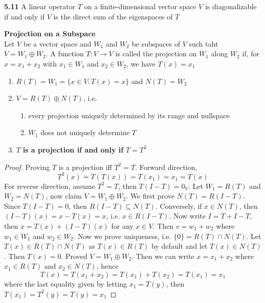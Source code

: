 \documentclass[11pt]{article}
\begin{document}
\begin{theorem*}
    \textbf{5.11} A linear operator $T$ on a finite-dimensional vector space $V$ is diagonalizable if and only if $V$ is the direct sum of the eigenspaces of $T$
\end{theorem*}



\begin{defn*}
    \textbf{Projection on a Subspace} \\
    Let $V$ be a vector space and $W_1$ and $W_2$ be subspaces of $V$ such taht $V = W_1 \oplus W_2$. A function $T:V\to V$ is called the projection on $W_1$ along $W_2$ if, for $x = x_1 + x_2$ with $x_1 \in W_1$ and $x_2\in W_2$, we have $T(x) = x_1$
    \begin{enumerate}
        \item $R(T) = W_1 = \{ x\in V: T(x) = x \}$ and $N(T) = W_2$
        \item $V = R(T) \oplus N(T)$, i.e. 
        \begin{enumerate}
            \item every projection uniquely determined by its range and nullspace
            \item $W_1$ does not uniquely determine $T$
        \end{enumerate}
        \item $T$ \textbf{is a projection if and only if} $T = T^2$
    \end{enumerate}
    \begin{proof}
        Proving $T$ is a projection iff $T^2 = T$. Forward direction, 
        \[
            T^2(x) = T(T(x)) = T(x_1) = x_1 = T(x)
        \]
        For reverse direction, assume $T^2 = T$, then $T(I-T) = 0_V$. Let $W_1 = R(T)$ and $W_2 = N(T)$, now claim $V = W_1 \oplus W_2$. We first prove $N(T) = R(I-T)$. Since $T(I-T)=0$, then $R(I-T)\subseteq N(T)$. Conversely, if $x\in N(T)$, then $(I-T)(x) = x - T(x) = x$, i.e. $x\in R(I-T)$. Now write $I = T+I-T$, then $x = T(x) + (I-T)(x)$ for any $x\in V$. Then $v = w_1 + w_2$ where $w_1\in W_1$ and $w_2\in W_2$. Now we prove uniqueness, i.e. $\{ 0\} = R(T) \cap N(T)$. Let $T(x) \in R(T) \cap N(T)$ as $T(x)\in R(T)$ by default and let $T(x)\in N(T)$. Then $T(x) = 0$. Proved $V = W_1 \oplus W_2$. Then we can write $x = x_1 + x_2$ where $x_1 \in R(T)$ and $x_2 \in N(T)$, hence 
        \[
            T(x) = T(x_1 + x_2) = T(x_1) + T(x_2) = T(x_1) = x_1
        \]
        where the last equality given by letting $x_1 = T(y)$, then $T(x_1) = T^2(y) = T(y)=  x_1$
    \end{proof}
\end{defn*}
\end{document}

